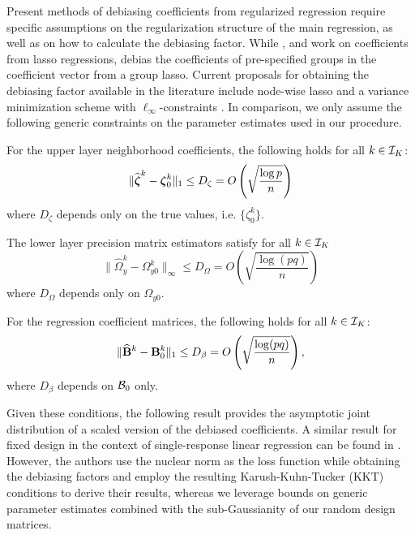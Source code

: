 Present methods of debiasing coefficients from regularized regression require specific assumptions on the regularization structure of the main regression, as well as on how to calculate the debiasing factor. While \citet{ZhangZhang14}, \citet{JavanmardMontanari14} and \citet{vanDeGeerEtal14} work on coefficients from lasso regressions, \citet{MitraZhang16} debias the coefficients of pre-specified groups in the coefficient vector from a group lasso. Current proposals for obtaining the debiasing factor available in the literature include node-wise lasso \citep{ZhangZhang14} and a variance minimization scheme with $\ell_\infty$-constraints \citep{JavanmardMontanari14}. In comparison, we only assume the following generic constraints on the parameter estimates used in our procedure.

\vspace{1em}
 For the upper layer neighborhood coefficients, the following holds for all $k \in {\cal{I}}_K$:
%
$$
\| \widehat {{\boldsymbol{\zeta}}}^k - {\boldsymbol{\zeta}}_0^k \|_1 \leq D_\zeta  = O \left( \sqrt { \frac{\log p}{n}} \right)
$$
%
where $D_\zeta$ depends only on the true values, i.e. $\{ \zeta^k_0 \}$.

 The lower layer precision matrix estimators satisfy for all $k \in {\cal{I}}_K$
%
$$
\| \widehat \Omega_y^k - \Omega_{y0}^k \|_\infty \leq D_\Omega
= O \left( \sqrt { \frac{\log (pq)}{n}} \right)$$
%
where $D_\Omega$ depends only on $\Omega_{y 0}$.

 For the regression coefficient matrices, the following holds for all $k \in {\cal{I}}_K$:
%
$$
\| \widehat {{\mathbf{B}}}^k - {\mathbf{B}}^k_0 \|_1 \leq D_\beta = O \left( \sqrt { \frac{\log (p q)}{n}} \right),
$$
%
where $D_\beta$ depends on ${\cal{B}}_0$ only.
\vspace{1em}

Given these conditions, the following result provides the asymptotic joint distribution of a scaled version of the debiased coefficients. A similar result for fixed design in the context of single-response linear regression can be found in \citet{StuckyVandeGeer17}. However, the authors use the nuclear norm as the loss function while obtaining the debiasing factors and employ the resulting Karush-Kuhn-Tucker (KKT) conditions to derive their results, whereas we leverage bounds on generic parameter estimates combined with the sub-Gaussianity of our random design matrices.

